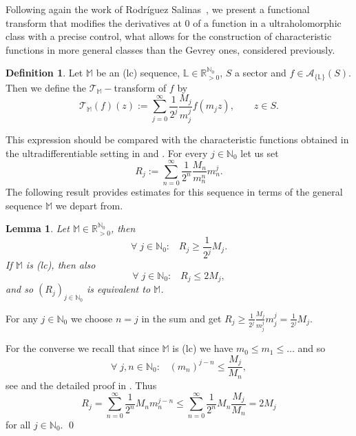 \documentclass[11pt,a4paper]{article}
\theoremstyle{plain}
\newtheorem{lemma}[proposition]{Lemma}
\theoremstyle{definition}
\newtheorem{definition}[proposition]{Definition}
\newcommand{\RR}{\mathbb{R}}
\newcommand{\NN}{\mathbb{N}}
\newcommand{\M}{\mathbb{M}}
\newcommand{\LL}{\mathbb{L}}
\begin{document}
Following again the work of Rodríguez Salinas~\cite{salinas62}, we present a functional transform that modifies the derivatives at 0 of a function in a ultraholomorphic class with a precise control, what allows for the construction of characteristic functions in more general classes than the Gevrey ones, considered previously.

\begin{definition}
	Let $\M$ be an (lc) sequence, $\LL\in\RR_{>0}^{\NN_0}$, $S$ a sector and %
$f\in \mathcal{A}_{\{\LL\}} (S)$. Then we define the $\mathcal{T}_{\M}-$transform of $f$ by
	\begin{equation*}%
		\mathcal{T}_{\M}(f)(z):= \sum_{j=0}^{\infty}\frac{1}{2^j} \frac{M_j}{m_j^j} f(m_j z), \qquad z\in S.
	\end{equation*}
\end{definition}
{This expression} should be compared with the characteristic functions obtained in the ultradifferentiable setting in \cite[Thm. 1]{thilliez} and \cite[Lemma 2.9]{compositionpaper}. For every $j\in\NN_0$ let us set
\begin{equation*}%
	R_j:=\sum^{\infty}_{n=0} \frac{1}{2^n} \frac{M_n}{m_n^n}m_n^j.
\end{equation*}
The following result provides estimates for this sequence in terms of the general sequence $\M$ we depart from.

\begin{lemma}\label{Scomplemma}
	Let $\M\in\RR_{>0}^{\NN_0}$, then
	$$\forall\;j\in\NN_0:\;\;\;R_j\ge\frac{1}{2^j} M_j.$$
	If $\M$ is (lc), then also
	$$\forall\;j\in\NN_0:\;\;\;R_j\le 2 M_j,$$
	and so $(R_j)_{j\in\NN_0}$ is equivalent to $\M$.
\end{lemma}

For any $j\in\NN_0$ we choose $n=j$ in the sum and get $R_j\ge\frac{1}{2^j} \frac{M_j}{m_j^j}m_j^j=\frac{1}{2^j} M_j$.

For the converse we recall that since $\M$ is (lc) we have $m_0\le m_1\le\dots$ and so
$$\forall\;j,n\in\NN_0:\;\;\;(m_n)^{j-n}\le\frac{M_j}{M_n},$$
see \cite[Thm. 1]{thilliez} and the detailed proof in \cite[(3.1.2)]{diploma}. Thus
$$R_j=\sum^{\infty}_{n=0}\frac{1}{2^n}M_n m_n^{j-n}\le\sum^{\infty}_{n=0}\frac{1}{2^n}M_n\frac{M_j}{M_n}=2M_j$$
for all $j\in\NN_0$.
\qed\enddemo

%
%
%
%
%
\end{document}
